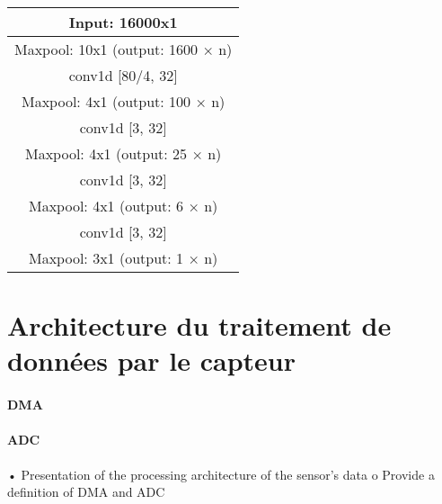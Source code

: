 \begin{center}
  \begin{tabular}{ |c|}
   \hline
    Input: 16000x1\\
   \hline
    Maxpool: 10x1 (output: 1600 × n)\\
   \hline
    conv1d [80/4, 32]\\
   \hline
    Maxpool: 4x1 (output: 100 × n)\\
   \hline
    conv1d [3, 32]\\
   \hline
    Maxpool: 4x1 (output: 25 × n)\\
   \hline
    conv1d [3, 32]\\
   \hline
    Maxpool: 4x1 (output: 6 × n)\\
   \hline
    conv1d [3, 32]\\
   \hline
    Maxpool: 3x1 (output: 1 × n)\\
   \hline
  \end{tabular}
\end{center}

\section{Architecture du traitement de données par le capteur}

\paragraph{DMA }
\paragraph{ADC }

• Presentation of the processing architecture of the sensor's data
o Provide a definition of DMA and ADC
